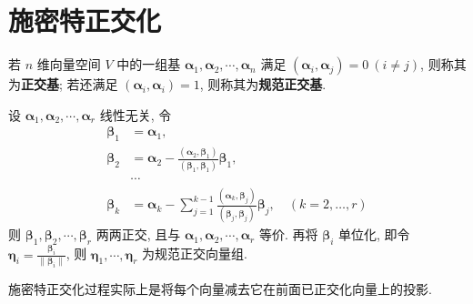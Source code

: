 \documentclass[12pt, a4paper, oneside, UTF8]{ctexbook}
\begin{document}
\section{施密特正交化}
\begin{definition}
    若 $n$ 维向量空间 $V$ 中的一组基 $\bm{\alpha}_1, \bm{\alpha}_2, \cdots, \bm{\alpha}_n$ 满足 $(\bm{\alpha}_i, \bm{\alpha}_j) = 0 \ (i \neq j)$, 则称其为\textbf{正交基}; 若还满足 $(\bm{\alpha}_i, \bm{\alpha}_i) = 1$, 则称其为\textbf{规范正交基}.
\end{definition}

\begin{theorem}[施密特正交化]
    设 $\bm{\alpha}_1, \bm{\alpha}_2, \cdots, \bm{\alpha}_r$ 线性无关, 令
    \begin{align*}
        \bm{\beta}_1 &= \bm{\alpha}_1, \\
        \bm{\beta}_2 &= \bm{\alpha}_2 - \frac{(\bm{\alpha}_2, \bm{\beta}_1)}{(\bm{\beta}_1, \bm{\beta}_1)}\bm{\beta}_1, \\
        &\cdots \\
        \bm{\beta}_k &= \bm{\alpha}_k - \sum_{j=1}^{k-1} \frac{(\bm{\alpha}_k, \bm{\beta}_j)}{(\bm{\beta}_j, \bm{\beta}_j)}\bm{\beta}_j, \quad (k=2, \dots, r)
    \end{align*}
    则 $\bm{\beta}_1, \bm{\beta}_2, \cdots, \bm{\beta}_r$ 两两正交, 且与 $\bm{\alpha}_1, \bm{\alpha}_2, \cdots, \bm{\alpha}_r$ 等价.
    再将 $\bm{\beta}_i$ 单位化, 即令 $\bm{\eta}_i = \frac{\bm{\beta}_i}{\|\bm{\beta}_i\|}$, 则 $\bm{\eta}_1, \cdots, \bm{\eta}_r$ 为规范正交向量组.
    \begin{myRemark}
        施密特正交化过程实际上是将每个向量减去它在前面已正交化向量上的投影.
    \end{myRemark}
\end{theorem}
\end{document}
